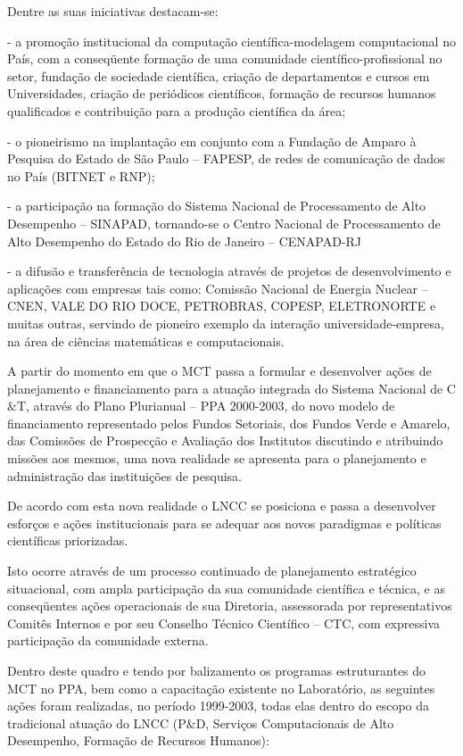 \documentclass[11pt,a4paper]{article}
\begin{document}
Dentre as suas iniciativas destacam-se:

- a promoção institucional da computação científica-modelagem computacional no País, com a conseqüente formação de uma comunidade científico-profissional no setor, fundação de sociedade científica, criação de departamentos e cursos em Universidades, criação de periódicos científicos, formação de recursos humanos qualificados e contribuição para a produção científica da área;

- o pioneirismo na implantação em conjunto com a Fundação de Amparo à Pesquisa do Estado de São Paulo – FAPESP, de redes de comunicação de dados no País (BITNET e RNP);

- a participação na formação do Sistema Nacional de Processamento de Alto Desempenho – SINAPAD, tornando-se o Centro Nacional de Processamento de Alto Desempenho do Estado do Rio de Janeiro – CENAPAD-RJ

- a difusão e transferência de tecnologia através de projetos de desenvolvimento e aplicações com empresas tais como: Comissão Nacional de Energia Nuclear – CNEN, VALE DO RIO DOCE, PETROBRAS, COPESP, ELETRONORTE e muitas outras, servindo de pioneiro exemplo da interação universidade-empresa, na área de ciências matemáticas e computacionais.

A partir do momento em que o MCT passa a formular e desenvolver ações de planejamento e financiamento para a atuação integrada do Sistema Nacional de C$\&$T, através do Plano Plurianual – PPA 2000-2003, do novo modelo de financiamento representado pelos Fundos Setoriais, dos Fundos Verde e Amarelo, das Comissões de Prospecção e Avaliação dos Institutos discutindo e atribuindo missões aos mesmos, uma nova realidade se apresenta para o planejamento e administração das instituições de pesquisa.

De acordo com esta nova realidade o LNCC se posiciona e passa a desenvolver esforços e ações institucionais para se adequar aos novos paradigmas e políticas científicas priorizadas.

Isto ocorre através de um processo continuado de planejamento estratégico situacional, com ampla participação da sua comunidade científica e técnica, e as conseqüentes ações operacionais de sua Diretoria, assessorada por representativos Comitês Internos e por seu Conselho Técnico Científico – CTC, com expressiva participação da comunidade externa.

Dentro deste quadro e tendo por balizamento os programas estruturantes do MCT no PPA, bem como a capacitação existente no Laboratório, as seguintes ações foram realizadas, no período 1999-2003, todas elas dentro do escopo da tradicional atuação do LNCC (P$\&$D, Serviços Computacionais de Alto Desempenho, Formação de Recursos Humanos):
\end{document}
